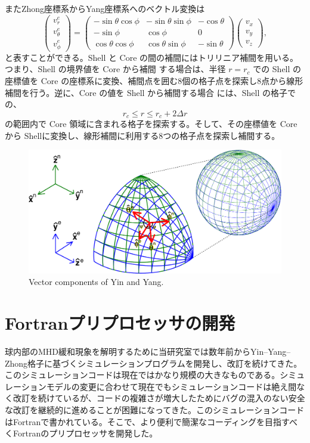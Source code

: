 \documentclass[12pt]{jsarticle}
\begin{document}
またZhong座標系からYang座標系へのベクトル変換は
\begin{equation}
\begin{pmatrix}
v^e_r \\ v^e_\theta \\ v^e_\phi  
\end{pmatrix} 
=
\begin{pmatrix}
-\sin\theta\cos\phi & -\sin\theta\sin\phi & -\cos\theta \\ -\sin\phi & \cos\phi & 0 \\ \cos\theta\cos\phi & \cos\theta\sin\phi & -\sin\theta
\end{pmatrix} 
\begin{pmatrix}
v_x \\ v_y \\ v_z  
\end{pmatrix} ,
\end{equation}
と表すことができる。Shell と Core の間の補間にはトリリニア補間を用いる。つまり、Shell の境界値を Core から補間 する場合は、半径 $r = r_c$ での Shell の座標値を Core の座標系に変換、補間点を囲む8個の格子点を探索し8点から線形補間を行う。逆に、Core の値を Shell から補間する場合 には、Shell の格子での、
\begin{equation}
r_c \leq r \leq r_c + 2\Delta r
\end{equation}
の範囲内で Core 領域に含まれる格子を探索する。そして、その座標値を Core から Shellに変換し、線形補間に利用する8つの格子点を探索し補間する。

\begin{figure}[H]
\centering
\includegraphics[height=0.75\textheight,width=1.0\hsize,angle=0,keepaspectratio]{./Image/sphericalNormalVectors.pdf}
\caption{Vector components of Yin and Yang.} \label{fig:sphericalNormalVectors}
\end{figure}

\section{Fortranプリプロセッサの開発}
球内部のMHD緩和現象を解明するために当研究室では数年前からYin--Yang--Zhong格子に基づくシミュレーションプログラムを開発し、改訂を続けてきた。このシミュレーションコードは現在ではかなり規模の大きなものである。シミュレーションモデルの変更に合わせて現在でもシミュレーションコードは絶え間なく改訂を続けているが、コードの複雑さが増大したためにバグの混入のない安全な改訂を継続的に進めることが困難になってきた。このシミュレーションコードはFortranで書かれている。そこで、より便利で簡潔なコーディングを目指すべくFortranのプリプロセッサを開発した。
\end{document}
